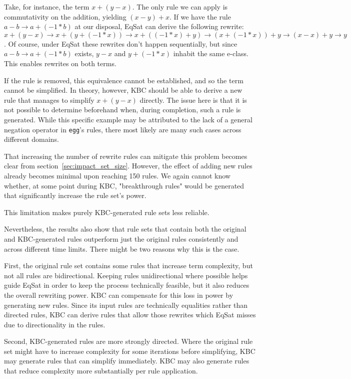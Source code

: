 Take, for instance, the term $x + (y - x)$. The only rule we can apply is commutativity on the addition, yielding $(x - y) + x$.  If we have the rule $a - b \to a + (-1 * b)$ at our disposal, EqSat can derive the following rewrite: $x + (y - x) \to x + (y + (-1 * x)) \to x + ((-1 * x) + y) \to (x + (-1 * x)) + y \to (x - x) + y \to y$. Of course, under EqSat these rewrites don't happen sequentially, but since $a - b \to a + (-1 * b)$ exists, $y - x$ and $y + (-1 * x)$ inhabit the same e-class. This enables rewrites on both terms.

If the rule is removed, this equivalence cannot be established, and so the term cannot be simplified. In theory, however, KBC should be able to derive a new rule that manages to simplify $x + (y - x)$ directly. The issue here is that it is not possible to determine beforehand when, during completion, such a rule is generated. While this specific example may be attributed to the lack of a general negation operator in \texttt{egg}'s rules, there most likely are many such cases across different domains.

That increasing the number of rewrite rules can mitigate this problem becomes clear from section~\ref{sec:impact_set_size}. However, the effect of adding new rules already becomes minimal upon reaching 150 rules. We again cannot know whether, at some point during KBC, "breakthrough rules" would be generated that significantly increase the rule set's power.

This limitation makes purely KBC-generated rule sets less reliable.

Nevertheless, the results also show that rule sets that contain both the original and KBC-generated rules outperform just the original rules consistently and across different time limits. There might be two reasons why this is the case.

First, the original rule set contains some rules that increase term complexity, but not all rules are bidirectional. Keeping rules unidirectional where possible helps guide EqSat in order to keep the process technically feasible, but it also reduces the overall rewriting power. KBC can compensate for this loss in power by generating new rules. Since its input rules are technically equalities rather than directed rules, KBC can derive rules that allow those rewrites which EqSat misses due to directionality in the rules. 

Second, KBC-generated rules are more strongly directed. Where the original rule set might have to increase complexity for some iterations before simplifying, KBC may generate rules that can simplify immediately. KBC may also generate rules that reduce complexity more substantially per rule application.


